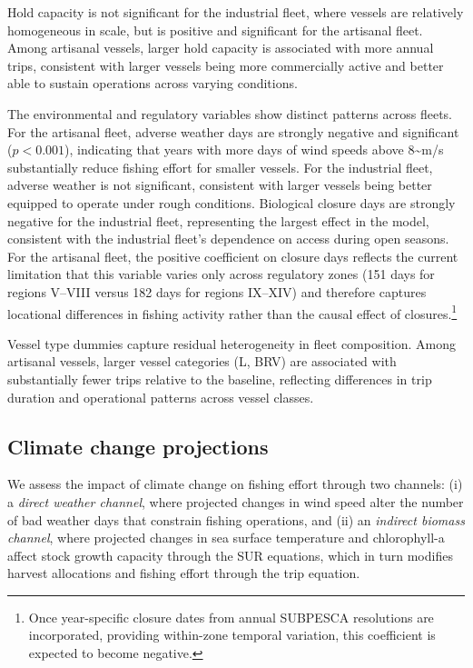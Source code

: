 \documentclass[
  11pt,
]{article}
\begin{document}
Hold capacity is not significant for the industrial fleet, where vessels are relatively homogeneous in scale, but is positive and significant for the artisanal fleet. Among artisanal vessels, larger hold capacity is associated with more annual trips, consistent with larger vessels being more commercially active and better able to sustain operations across varying conditions.

The environmental and regulatory variables show distinct patterns across fleets. For the artisanal fleet, adverse weather days are strongly negative and significant (\(p < 0.001\)), indicating that years with more days of wind speeds above 8\textasciitilde m/s substantially reduce fishing effort for smaller vessels. For the industrial fleet, adverse weather is not significant, consistent with larger vessels being better equipped to operate under rough conditions. Biological closure days are strongly negative for the industrial fleet, representing the largest effect in the model, consistent with the industrial fleet's dependence on access during open seasons. For the artisanal fleet, the positive coefficient on closure days reflects the current limitation that this variable varies only across regulatory zones (151 days for regions V--VIII versus 182 days for regions IX--XIV) and therefore captures locational differences in fishing activity rather than the causal effect of closures.\footnote{Once year-specific closure dates from annual SUBPESCA resolutions are incorporated, providing within-zone temporal variation, this coefficient is expected to become negative.}

Vessel type dummies capture residual heterogeneity in fleet composition. Among artisanal vessels, larger vessel categories (L, BRV) are associated with substantially fewer trips relative to the baseline, reflecting differences in trip duration and operational patterns across vessel classes.

\subsection{Climate change projections}\label{projections}

We assess the impact of climate change on fishing effort through two channels: (i) a \emph{direct weather channel}, where projected changes in wind speed alter the number of bad weather days that constrain fishing operations, and (ii) an \emph{indirect biomass channel}, where projected changes in sea surface temperature and chlorophyll-a affect stock growth capacity through the SUR equations, which in turn modifies harvest allocations and fishing effort through the trip equation.
\end{document}
